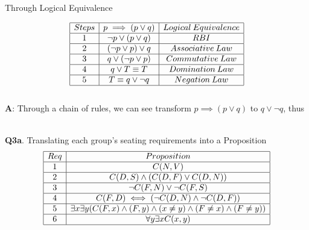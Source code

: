 \documentclass[12pt, letterpaper]{article}
\begin{document}
{\large\centerline{Through Logical Equivalence}}
\begin{displaymath}
    \begin{array}{|c|c|c|}
    \hline
    Steps & p \implies (p \lor q) & Logical \: Equivalence \\ %
    \hline %
    1 & \neg p \lor (p \lor q) & RBI\\
    \hline
    2 & (\neg p \lor p) \lor q & Associative \: Law\\
    \hline
    3 & q \lor (\neg p \lor p) & Commutative\: Law\\
    \hline
    4 & q \lor T \equiv T & Domination \: Law\\
    \hline
    5 & T \equiv q \lor \neg q & Negation\: Law\\
    \hline
    \end{array}
\end{displaymath} \\

\textbf{A}: Through a chain of rules, we can see transform $p \implies (p \lor q)$ to $q \lor \neg q$, thus 

\setlength\parindent{40pt}{proving that they're Logically Equivalent}\\[0.5in]

\textbf{Q3a}. Translating each group's seating requirements into a Proposition\\

\begin{displaymath}
    \begin{array}{|c|c|}
    \hline
    Req & Proposition\\ %
    \hline %
    1 & C(N,V)\\
    \hline
    2 & C(D,S)\land (C(D,F)\lor C(D,N))\\
    \hline
    3 & \neg C(F,N) \lor \neg C(F,S)\\
    \hline
    4 & C(F,D) \iff (\neg C(D,N) \land \neg C(D,F))\\
    \hline
    5 & \exists x\exists y(C(F,x) \land (F,y) \land (x \ne y) \land (F \ne x) \land (F \ne y))\\
    \hline
    6 & \forall y\exists xC(x,y)\\
    \hline
    \end{array}
\end{displaymath} \\[1in]
\end{document}
